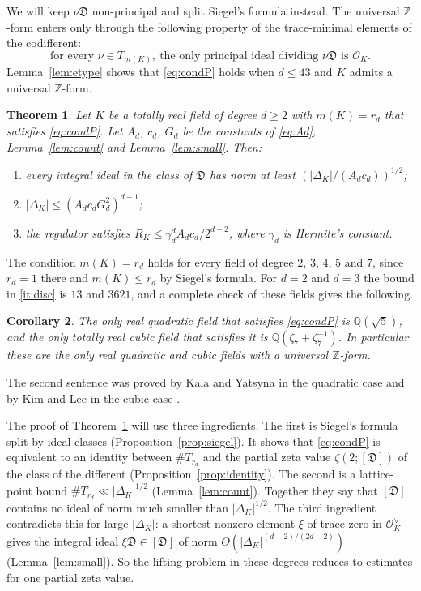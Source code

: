 \documentclass[11pt]{amsart}
\newtheorem{theorem}{Theorem}[section]
\newtheorem{corollary}[theorem]{Corollary}
\theoremstyle{definition}
\numberwithin{equation}{section}
\newcommand{\OK}{\mathcal{O}_K}
\newcommand{\OKd}{\mathcal{O}_K^{\vee}}
\newcommand{\Dif}{\mathfrak{D}}
\newcommand{\Q}{\mathbb{Q}}
\newcommand{\Z}{\mathbb{Z}}
\begin{document}
We will keep $\nu\Dif$ non-principal and split Siegel's formula instead.  The universal $\Z$-form
enters only through the following property of the trace-minimal elements of the codifferent:
\begin{equation}\label{eq:condP}
  \text{for every }\nu\in T_{m(K)},\ \text{the only principal ideal dividing }\nu\Dif\text{ is }\OK.
\end{equation}
Lemma~\ref{lem:etype} shows that \eqref{eq:condP} holds when $d\le43$ and $K$ admits a universal
$\Z$-form.

\begin{theorem}\label{thm:main}
Let $K$ be a totally real field of degree $d\ge2$ with $m(K)=r_d$ that satisfies \eqref{eq:condP}.
Let $A_d$, $c_d$, $G_d$ be the constants of \eqref{eq:Ad}, Lemma~\textup{\ref{lem:count}} and
Lemma~\textup{\ref{lem:small}}.  Then:
\begin{enumerate}[label=\textup{(\arabic*)}]
\item\label{it:class} every integral ideal in the class of $\Dif$ has norm at least
  $(|\Delta_K|/(A_dc_d))^{1/2}$;
\item\label{it:disc} $|\Delta_K|\le(A_dc_dG_d^2)^{d-1}$;
\item\label{it:reg} the regulator satisfies $R_K\le\gamma_d^d A_dc_d/2^{d-2}$, where $\gamma_d$ is
  Hermite's constant.
\end{enumerate}
\end{theorem}

The condition $m(K)=r_d$ holds for every field of degree $2$, $3$, $4$, $5$ and $7$, since $r_d=1$
there and $m(K)\le r_d$ by Siegel's formula.  For $d=2$ and $d=3$ the bound in
\ref{it:disc} is $13$ and $3621$, and a complete check of these fields gives the following.

\begin{corollary}\label{cor:cubic}
The only real quadratic field that satisfies \eqref{eq:condP} is $\Q(\sqrt5)$, and the only totally
real cubic field that satisfies it is $\Q(\zeta_7+\zeta_7^{-1})$.  In particular these are the only real quadratic and
cubic fields with a universal $\Z$-form.
\end{corollary}

The second sentence was proved by Kala and Yatsyna in the quadratic case \cite[Theorem~1.1]{KY1}
and by Kim and Lee in the cubic case \cite[Theorem~1.3]{KL}.

The proof of Theorem~\ref{thm:main} will use three ingredients.  The first is Siegel's formula split
by ideal classes (Proposition~\ref{prop:siegel}).  It shows that \eqref{eq:condP} is equivalent to
an identity between $\#T_{r_d}$ and the partial zeta value $\zeta(2;[\Dif])$ of the class of the
different (Proposition~\ref{prop:identity}).  The second is a lattice-point bound
$\#T_{r_d}\ll|\Delta_K|^{1/2}$ (Lemma~\ref{lem:count}).  Together they say that $[\Dif]$ contains no
ideal of norm much smaller than $|\Delta_K|^{1/2}$.  The third ingredient contradicts this for large
$|\Delta_K|$: a shortest nonzero element $\xi$ of trace zero in $\OKd$ gives the integral ideal
$\xi\Dif\in[\Dif]$ of norm $O(|\Delta_K|^{(d-2)/(2d-2)})$ (Lemma~\ref{lem:small}).  So the lifting
problem in these degrees reduces to estimates for one partial zeta value.
\end{document}
